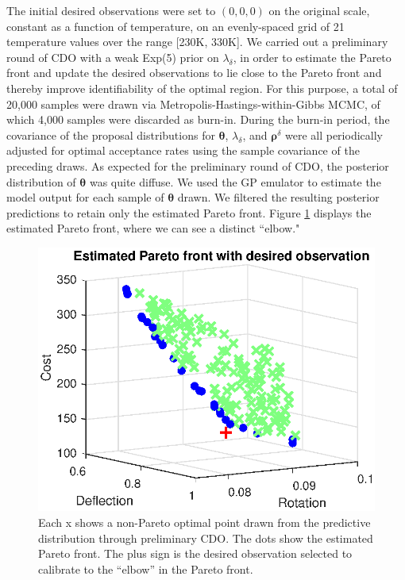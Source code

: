 \documentclass[12pt]{article}
\begin{document}
The initial desired observations were set to $(0,0,0)$ on the original scale, constant as a function of temperature, on an evenly-spaced grid of 21 temperature values over the range [230K, 330K].
%
We carried out a preliminary round of CDO with a weak Exp(5) prior on $\lambda_\delta$, in order to estimate the Pareto front and update the desired observations to lie close to the Pareto front and thereby improve identifiability of the optimal region.
%
For this purpose, a total of 20,000 samples were drawn via Metropolis-Hastings-within-Gibbs MCMC, of which 4,000 samples were discarded as burn-in. 
%
During the burn-in period, the covariance of the proposal distributions for $\boldsymbol \theta$, $\lambda_\delta$, and $\boldsymbol\rho^\delta$ were all periodically adjusted for optimal acceptance rates using the sample covariance of the preceding draws.
%
%
%
As expected for the preliminary round of CDO, the posterior distribution of $\boldsymbol\theta$ was quite diffuse.
%
We used the GP emulator to estimate the model output for each sample of $\boldsymbol \theta$ drawn.
%
We filtered the resulting posterior predictions to retain only the estimated Pareto front.
%
Figure \ref{fig:elbow} displays the estimated Pareto front, where we can see a distinct ``elbow."
%
\begin{figure}
\centering
\includegraphics[scale=0.8]{FIG_est_PF_with_des_obs.eps}
\caption{Each x shows a non-Pareto optimal point drawn from the predictive distribution through preliminary CDO. The dots show the estimated Pareto front. The plus sign is the desired observation selected to calibrate to the ``elbow'' in the Pareto front.}
\label{fig:elbow}
\end{figure}
\end{document}
